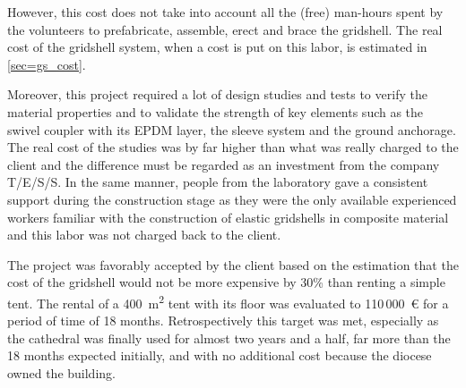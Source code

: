 However, this cost does not take into account all the (free) man-hours spent by the volunteers to prefabricate, assemble, erect and brace the gridshell. The real cost of the gridshell system, when a cost is put on this labor, is estimated in \cref{sec=gs_cost}.



Moreover, this project required a lot of design studies and tests to verify the material properties and to validate the strength of key elements such as the swivel coupler with its EPDM layer, the sleeve system and the ground anchorage. The real cost of the studies was by far higher than what was really charged to the client and the difference must be regarded as an investment from the company T/E/S/S. In the same manner, people from the laboratory gave a consistent support during the construction stage as they were the only available experienced workers familiar with the construction of elastic gridshells in composite material \cite{Douthe2010a,Baverel2012} and this labor was not charged back to the client.

The project was favorably accepted by the client based on the estimation that the cost of the gridshell would not be more expensive by 30\% than renting a simple tent. The rental of a 400~m\textsuperscript{2} tent with its floor was evaluated to 110\,000~€ for a period of time of 18 months. Retrospectively this target was met, especially as the cathedral was finally used for almost two years and a half, far more than the 18 months expected initially, and with no additional cost because the diocese owned the building.

